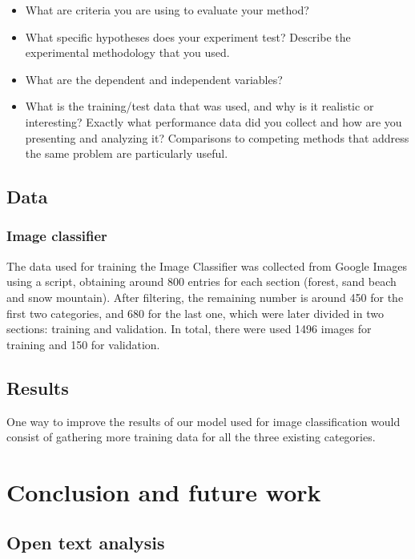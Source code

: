 \documentclass[runningheads,a4paper,11pt]{report}
\begin{document}
\begin{itemize}
	\item What are criteria you are using to evaluate your method? 
	\item What specific hypotheses does your experiment test? Describe the experimental methodology that you used. 
	\item What are the dependent and independent variables? 
	\item What is the training/test data that was used, and why is it realistic or interesting? Exactly what performance data did you collect and how are you presenting and analyzing it? Comparisons to competing methods that address the same problem are particularly useful.
\end{itemize}

\section{Data}
\label{section:data}

\subsection{Image classifier}
The data used for training the Image Classifier was collected from Google Images using a script, obtaining around 800 entries for each section (forest, sand beach and snow mountain). After filtering, the remaining number is around 450 for the first two categories, and 680 for the last one, which were later divided in two sections: training and validation. In total, there were used 1496 images for training and 150 for validation. 

\section{Results}
\label{section:results}

One way to improve the results of our model used for image classification would consist of gathering more training data for all the three existing categories.


\chapter{Conclusion and future work}
\label{chapter:concl}

\section{Open text analysis}
\end{document}
